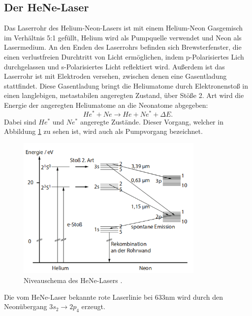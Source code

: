 \subsection{Der HeNe-Laser}
Das Laserrohr des Helium-Neon-Lasers ist mit einem Helium-Neon Gasgemisch im Verhältnis 5:1 gefüllt,
Helium wird als Pumpquelle verwendet und Neon als Lasermedium. An den Enden des Laserrohrs befinden sich
Brewsterfenster, die einen verlustfreien Durchtritt von Licht ermöglichen, indem p-Polarisiertes Lich
durchgelassen und s-Polarisiertes Licht reflektiert wird. Außerdem ist das Laserrohr ist mit Elektroden versehen,
zwischen denen eine Gasentladung stattfindet. Diese Gasentladung bringt die Heliumatome durch Elektronenstoß in einen
langlebigen, metastabilen angeregten Zustand, über Stöße 2. Art wird die Energie der angeregten Heliumatome an die
Neonatome abgegeben:
\begin{equation}
  He^* + Ne \rightarrow He + Ne^* + \Delta E.
\end{equation}
Dabei sind $He^*$ und $Ne^*$ angeregte Zustände. Dieser Vorgang, welcher in Abbildung \ref{fig:entladung} zu sehen ist,
wird auch als Pumpvorgang bezeichnet.

\begin{figure}[H]
  \centering
  \includegraphics[height=7cm]{Entladung.png}
  \caption{Niveauschema des HeNe-Lasers \cite{springer2}.}
  \label{fig:entladung}
\end{figure}

Die vom HeNe-Laser bekannte rote Laserlinie bei 633\;nm wird durch den Neonübergang $3s_2 \rightarrow 2p_4$
erzeugt.

